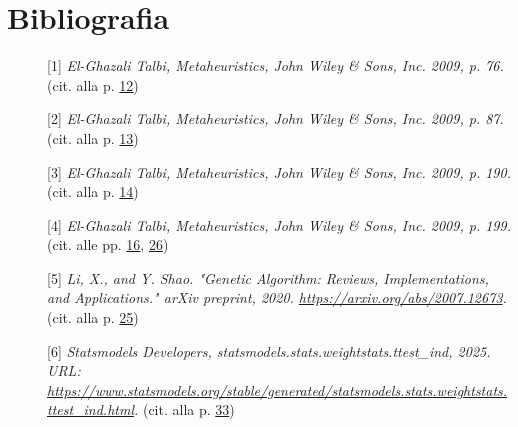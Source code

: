 \cleardoublepage
\chapter{Bibliografia}

\hypertarget{bibliografia}{}

\nocite{*}

\printbibliography[heading=subbibliography,title={Riferimenti bibliografici},type=book]

\printbibliography[heading=subbibliography,title={Siti web consultati},type=online]



\begin{description}
    \item[][1] \emph{El-Ghazali Talbi, Metaheuristics, John Wiley \& Sons, Inc. 2009, p. 76.} (cit. alla p. \hyperlink{metaeuristiche}{12})
    \item[][2] \emph{El-Ghazali Talbi, Metaheuristics, John Wiley \& Sons, Inc. 2009, p. 87.} (cit. alla p. \hyperlink{ssb}{13})
    \item[][3] \emph{El-Ghazali Talbi, Metaheuristics, John Wiley \& Sons, Inc. 2009, p. 190.} (cit. alla p. \hyperlink{pb}{14})
    \item[][4] \emph{El-Ghazali Talbi, Metaheuristics, John Wiley \& Sons, Inc. 2009, p. 199.} (cit. alle pp. \hyperlink{ea}{16}, \hyperlink{og}{26})
    \item[][5] \emph{Li, X., and Y. Shao. "Genetic Algorithm: Reviews, Implementations, and Applications." arXiv preprint, 2020. \url{https://arxiv.org/abs/2007.12673}.} (cit. alla p. \hyperlink{ga}{25})
    \item[][6] \emph{Statsmodels Developers, statsmodels.stats.weightstats.ttest\_ind, 2025. URL: \url{https://www.statsmodels.org/stable/generated/statsmodels.stats.weightstats.ttest_ind.html}.} (cit. alla p. \hyperlink{ttest}{33})
\end{description}

